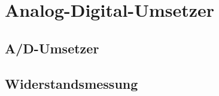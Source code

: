 \section{Analog-Digital-Umsetzer}
\subsection{A/D-Umsetzer}
\subsubsection{}


\subsubsection{}



\subsection{Widerstandsmessung}